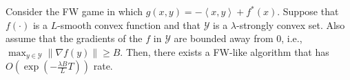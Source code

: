 \documentclass[pmlr]{jmlr} %
\def\reals{\mathbb{R}}
\def\reals{\mathbb{R}}
\newcommand{\norm}[1]{\left\lVert#1\right\rVert}
\newcommand{\norme}[1]{\norm{#1}}
\newcommand{\lr}[2]{\left\langle#1,#2\right\rangle}
\newcommand{\YY}{\mathcal{Y}}
\newcommand{\pr}[1]{\left(#1\right)}
\begin{document}
\begin{theorem}\label{thm:linearFW} 
Consider the FW game in which $g(x,y)= -\lr{x}{y} + f^{*}(x)$.
Suppose that $f(\cdot)$ is a $L$-smooth convex function
and that $\YY$ is a $\lambda$-strongly convex set. Also assume that the gradients of the $f$ in $\YY$ are bounded away from $0$, i.e., $\max_{y\in\YY}\|\nabla f(y)\|\geq B$.
Then, there exists a FW-like algorithm that has $O(\exp(-\frac{\lambda B }{L} T))$ rate.
\end{theorem}












\end{document}
